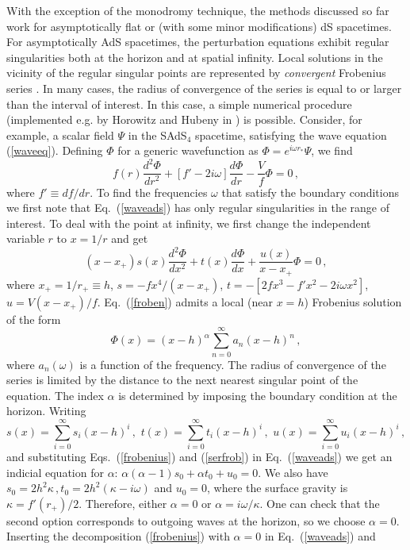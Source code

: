\documentclass[]{iopart}
\def\be{\begin{equation}}
\def\ee{\end{equation}}
\begin{document}
With the exception of the monodromy technique, the methods discussed so far
work for asymptotically flat or (with some minor modifications) dS
spacetimes. For asymptotically AdS spacetimes, the perturbation equations
exhibit regular singularities both at the horizon and at spatial infinity.
Local solutions in the vicinity of the regular singular points are represented
by {\it convergent} Frobenius series \cite{arfken}. In many cases, the radius
of convergence of the series is equal to or larger than the interval of
interest. In this case, a simple numerical procedure (implemented e.g. by
Horowitz and Hubeny in \cite{Horowitz:1999jd}) is possible.
%
Consider, for example, a scalar field $\Psi$ in the SAdS$_4$ spacetime,
satisfying the wave equation (\ref{waveeq}). Defining $\Phi$ for a generic
wavefunction as $\Phi=e^{i\omega r_*} \Psi$, we find
%
\be f(r)\frac{d^{2} \Phi}{d r^{2}}+ \left\lbrack
f'-2i\omega \right\rbrack \frac{d \Phi}{d r}
-\frac{V}{f}\Phi=0\,,\label{waveads}\ee
%
where $f'\equiv df/dr$. To find the frequencies $\omega$ that satisfy the
boundary conditions we first note that Eq.~(\ref{waveads}) has only regular
singularities in the range of interest. To deal with the point at infinity,
we first change the independent variable $r$ to $x=1/r$ and get
%
\be 
\label{froben}
(x-x_+)s(x)\frac{d^{2} \Phi}{d x^{2}}+
t(x)\frac{d \Phi}{d x}+\frac{u(x)}{x-x_+}\Phi=0\,, \ee
%
where $x_+=1/r_+\equiv h$, $s= -fx^4/(x-x_+)$, $t=- \left\lbrack 2fx^3-f'x^2-2i\omega x^2
\right\rbrack$, $u=V(x-x_+)/f$.
%
Eq.~(\ref{froben}) admits a local (near $x=h$) Frobenius solution of the form
%
\be \Phi(x)= (x-h)^{\alpha}\sum_{n=0}^{\infty} a_{n} (x-h)^n \,,
\label{frobenius} 
\ee
%
where $a_{n}(\omega)$ is a function of the frequency.  The radius of
convergence of the series is limited by the distance to the next nearest
singular point of the equation.  The index $\alpha$ is determined by imposing
the boundary condition at the horizon.  Writing
%
\be 
\label{serfrob}
s(x)=\sum_{i=0}^\infty s_i(x-h)^i\,,\,\,
t(x)=\sum_{i=0}^\infty t_i(x-h)^i\,,\,\,
u(x)=\sum_{i=0}^\infty u_i(x-h)^i\,, 
\ee
%
and substituting Eqs.~(\ref{frobenius}) and (\ref{serfrob}) in
Eq.~(\ref{waveads}) we get an indicial equation for $\alpha$:
$\alpha(\alpha-1)s_0+\alpha t_0+u_0=0$. We also have
$s_0=2h^2\kappa\,,t_0=2h^2(\kappa-i\omega)$ and $u_0=0$, where the surface
gravity is $\kappa=f'(r_+)/2$.  Therefore, either $\alpha=0$ or
$\alpha=i\omega/\kappa$. One can check that the second option corresponds to
outgoing waves at the horizon, so we choose $\alpha=0$.  Inserting the
decomposition (\ref{frobenius}) with $\alpha=0$ in Eq.~(\ref{waveads}) and
\end{document}
